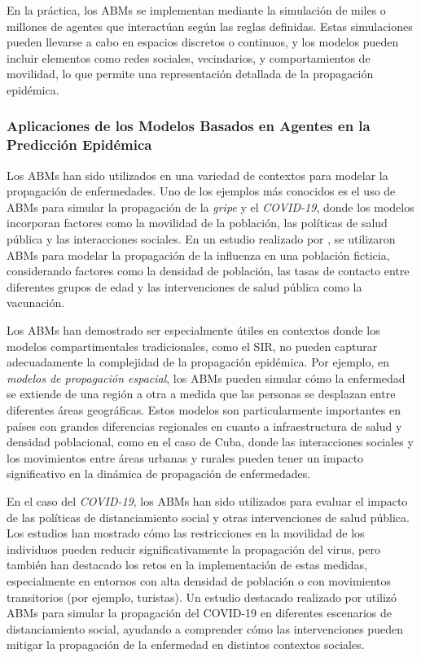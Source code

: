 En la práctica, los ABMs se implementan mediante la simulación de miles o millones de agentes que interactúan según las reglas definidas. Estas simulaciones pueden llevarse a cabo en espacios discretos o continuos, y los modelos pueden incluir elementos como redes sociales, vecindarios, y comportamientos de movilidad, lo que permite una representación detallada de la propagación epidémica\parencite{Datilo2019EpidemicForecasting, Shinde2020ForecastingCOVID}.

\subsubsection{Aplicaciones de los Modelos Basados en Agentes en la Predicción Epidémica}

Los ABMs han sido utilizados en una variedad de contextos para modelar la propagación de enfermedades. Uno de los ejemplos más conocidos es el uso de ABMs para simular la propagación de la \textit{gripe} y el \textit{COVID-19}, donde los modelos incorporan factores como la movilidad de la población, las políticas de salud pública y las interacciones sociales. En un estudio realizado por \textcite{Mata2021MathematicalEpidemics}, se utilizaron ABMs para modelar la propagación de la influenza en una población ficticia, considerando factores como la densidad de población, las tasas de contacto entre diferentes grupos de edad y las intervenciones de salud pública como la vacunación.

Los ABMs han demostrado ser especialmente útiles en contextos donde los modelos compartimentales tradicionales, como el SIR, no pueden capturar adecuadamente la complejidad de la propagación epidémica. Por ejemplo, en \textit{modelos de propagación espacial}, los ABMs pueden simular cómo la enfermedad se extiende de una región a otra a medida que las personas se desplazan entre diferentes áreas geográficas. Estos modelos son particularmente importantes en países con grandes diferencias regionales en cuanto a infraestructura de salud y densidad poblacional, como en el caso de Cuba, donde las interacciones sociales y los movimientos entre áreas urbanas y rurales pueden tener un impacto significativo en la dinámica de propagación de enfermedades\parencite{Chowell2016EarlyGrowth, Moein2021SIRInefficiency}.

En el caso del \textit{COVID-19}, los ABMs han sido utilizados para evaluar el impacto de las políticas de distanciamiento social y otras intervenciones de salud pública. Los estudios han mostrado cómo las restricciones en la movilidad de los individuos pueden reducir significativamente la propagación del virus, pero también han destacado los retos en la implementación de estas medidas, especialmente en entornos con alta densidad de población o con movimientos transitorios (por ejemplo, turistas)\parencite{Nowzari2016ComplexNetworks}. Un estudio destacado realizado por \textcite{Datilo2019EpidemicForecasting} utilizó ABMs para simular la propagación del COVID-19 en diferentes escenarios de distanciamiento social, ayudando a comprender cómo las intervenciones pueden mitigar la propagación de la enfermedad en distintos contextos sociales.

